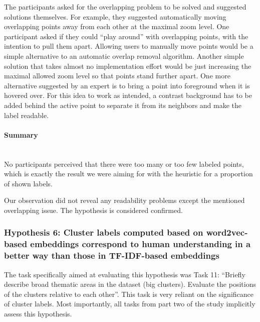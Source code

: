 The participants asked for the overlapping problem to be solved and suggested solutions themselves. 
For example, they suggested automatically moving overlapping points away from each other at the maximal zoom level.
One participant asked if they could ``play around'' with overlapping points, with the intention to pull them apart.
Allowing users to manually move points would be a simple alternative to an automatic overlap removal algorithm.
Another simple solution that takes almost no implementation effort would be just increasing the maximal allowed zoom level so that points stand further apart.
One more alternative suggested by an expert is to bring a point into foreground when it is hovered over. 
For this idea to work as intended, a contrast background has to be added behind the active point to separate it from its neighbors and make the label readable.

\paragraph{Summary}~\\
No participants perceived that there were too many or too few labeled points, which is exactly the result we were aiming for with the heuristic for a proportion of shown labels.

Our observation did not reveal any readability problems except the mentioned overlapping issue.
The hypothesis is considered confirmed.

\subsubsection{Hypothesis 6: Cluster labels computed based on word2vec-based embeddings correspond to human understanding in a better way than those in TF-IDF-based embeddings}
\label{subsubsec:hypothesis6}

The task specifically aimed at evaluating this hypothesis was Task 11: ``Briefly describe broad thematic areas in the dataset (big clusters). Evaluate the positions of the clusters relative to each other''.
This task is very reliant on the significance of cluster labels.
Most importantly, all tasks from part two of the study implicitly assess this hypothesis.

